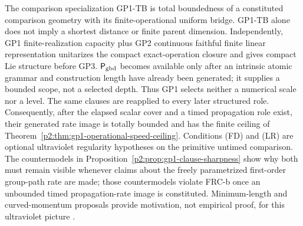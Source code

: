 \documentclass[12pt,a4paper]{article}
\begin{document}
The comparison specialization GP1-TB is total boundedness of a constituted
comparison geometry with its finite-operational uniform bridge.  GP1-TB alone
does not imply a shortest distance or finite parent dimension.  Independently,
GP1 finite-realization capacity plus GP2 continuous faithful finite linear
representation unitarizes the compact exact-operation closure and gives
compact Lie structure before GP3.  \(\mathsf P_{\rm gbd}\) becomes available only after an
intrinsic atomic grammar and construction length have already been generated;
it supplies a bounded scope, not a selected depth.  Thus GP1 selects neither a
numerical scale nor a level.  The same clauses are reapplied to every later
structured role.  Consequently, after the elapsed scalar cover and a timed
propagation role exist, their generated rate image is totally bounded and has
the finite ceiling of Theorem~\ref{p2:thm:gp1-operational-speed-ceiling}.
Conditions (FD) and (LR) are optional ultraviolet regularity hypotheses on the
primitive untimed comparison.
The countermodels in
Proposition~\ref{p2:prop:gp1-clause-sharpness} show why both must remain
visible whenever claims about the freely parametrized first-order group-path
rate are made; those countermodels violate FRC-b once an unbounded timed
propagation-rate image is constituted.  Minimum-length and curved-momentum proposals provide motivation,
not empirical proof, for this ultraviolet picture
\cite{Garay1995,Hossenfelder2013,AmelinoCamelia2002,MagueijoSmolin2002,
Snyder1947,KowalskiGlikman2002DSR,RelativeLocality2011}.
\end{document}
